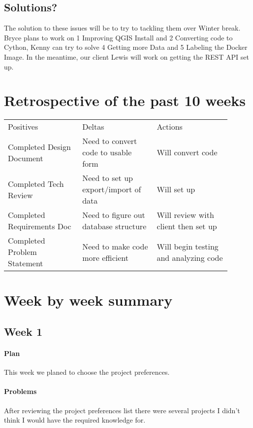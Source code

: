 \documentclass[onecolumn, draftclsnofoot,10pt, compsoc]{IEEEtran}
\begin{document}
\subsection{Solutions?}

The solution to these issues will be to try to tackling them over Winter break. Bryce plans to work on 1 Improving QGIS Install and 2 Converting code to Cython, Kenny can try to solve 4 Getting more Data and 5 Labeling the Docker Image. In the meantime, our client Lewis will work on getting the REST API set up.

\section{Retrospective of the past 10 weeks}

\begin{center}
\begin{tabular}{ p{0.3\linewidth} p{0.3\linewidth} p{0.3\linewidth} }
 Positives & Deltas & Actions \\
 Completed Design Document  & Need to convert code to usable form & Will convert code \\
 Completed Tech Review & Need to set up export/import of data & Will set up \\
 Completed Requirements Doc & Need to figure out database structure & Will review with client then set up \\
 Completed Problem Statement & Need to make code more efficient & Will begin testing and analyzing code
\end{tabular}
\end{center}

\section{Week by week summary}

\subsection{Week 1}

\paragraph{Plan}
This week we planed to choose the project preferences.
\paragraph{Problems}
After reviewing the project preferences list there were several projects I didn't think I would have the required knowledge for.
\end{document}
